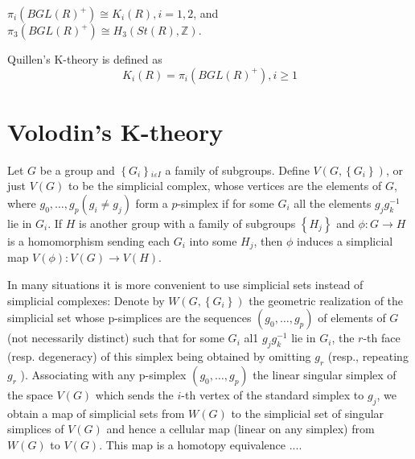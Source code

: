 \begin{coro}
$\pi_i\left(B G L(R)^{+}\right) \cong K_i(R), i=1,2$, and
$
\pi_3\left(B G L(R)^{+}\right) \cong H_3(S t(R), \mathbb{Z}) .
$
\end{coro}
Quillen's K-theory is defined as
$$K_i(R)=\pi_i\left(B G L(R)^{+}\right), i \geq 1$$





\chapter{Volodin's K-theory}

Let $G$ be a group and $\left\{G_i\right\}{ }_{i \varepsilon I}$ a family of subgroups. Define $V\left(G,\left\{G_i\right\}\right)$, or just $V(G)$ to be the simplicial complex, whose vertices are the elements of $G$, where $g_0, \ldots, g_p\left(g_i \neq g_j\right)$ form a $p$-simplex if for some $G_i$ all the elements $g_j g_k^{-1}$ lie in $G_i$. If $H$ is another group with a family of subgroups $\left\{H_j\right\}$ and $\phi: G \rightarrow H$ is a homomorphism sending each $G_i$ into some $H_j$, then $\phi$ induces a simplicial map $V(\phi): V(G) \rightarrow V(H)$.

In many situations it is more convenient to use simplicial sets instead of simplicial complexes: Denote by $W\left(G,\left\{G_i\right\}\right)$ the geometric realization of the simplicial set whose p-simplices are the sequences $\left(g_0, \ldots, g_p\right)$ of elements of $G$ (not necessarily distinct) such that for some $G_i$ al1 $g_j g_k^{-1}$ lie in $G_i$, the $r$-th face (resp. degeneracy) of this simplex being obtained by omitting $g_r$ (resp., repeating $g_r$ ). Associating with any p-simplex $\left(g_0, \ldots, g_p\right)$ the linear singular simplex of the space $V(G)$ which sends the $i$-th vertex of the standard simplex to $g_j$, we obtain a map of simplicial sets from $W(G)$ to the simplicial set of singular simplices of $V(G)$ and hence a cellular map (linear on any simplex) from $W(G)$ to $V(G)$. This map is a homotopy equivalence .... %

